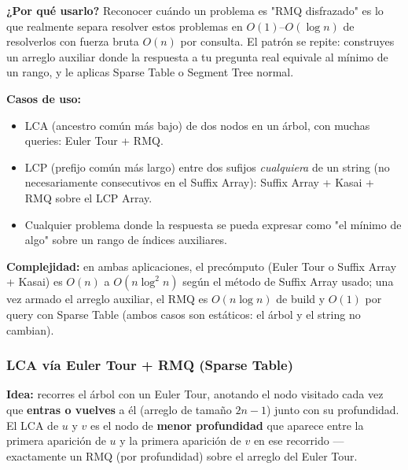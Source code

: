 \documentclass[10pt,a4paper,twocolumn]{article}
\begin{document}
\textbf{¿Por qué usarlo?} Reconocer cuándo un problema es "RMQ
disfrazado" es lo que realmente separa resolver estos problemas en
$O(1)$–$O(\log n)$ de resolverlos con fuerza bruta $O(n)$ por
consulta. El patrón se repite: construyes un arreglo auxiliar donde
la respuesta a tu pregunta real equivale al mínimo de un rango, y le
aplicas Sparse Table o Segment Tree normal.

\textbf{Casos de uso:}

\begin{itemize}
    \item LCA (ancestro común más bajo) de dos nodos en un árbol, con
    muchas queries: Euler Tour + RMQ.
    \item LCP (prefijo común más largo) entre dos sufijos
    \emph{cualquiera} de un string (no necesariamente consecutivos en
    el Suffix Array): Suffix Array + Kasai + RMQ sobre el LCP Array.
    \item Cualquier problema donde la respuesta se pueda expresar como
    "el mínimo de algo" sobre un rango de índices auxiliares.
\end{itemize}

\textbf{Complejidad:} en ambas aplicaciones, el precómputo (Euler
Tour o Suffix Array + Kasai) es $O(n)$ a $O(n\log^2 n)$ según el
método de Suffix Array usado; una vez armado el arreglo auxiliar, el
RMQ es $O(n\log n)$ de build y $O(1)$ por query con Sparse Table
(ambos casos son estáticos: el árbol y el string no cambian).


\subsubsection{LCA vía Euler Tour + RMQ (Sparse Table)}

\textbf{Idea:} recorres el árbol con un Euler Tour, anotando el nodo
visitado cada vez que \textbf{entras o vuelves} a él (arreglo de
tamaño $2n-1$) junto con su profundidad. El LCA de $u$ y $v$ es el
nodo de \textbf{menor profundidad} que aparece entre la primera
aparición de $u$ y la primera aparición de $v$ en ese recorrido —
exactamente un RMQ (por profundidad) sobre el arreglo del Euler Tour.
\end{document}
